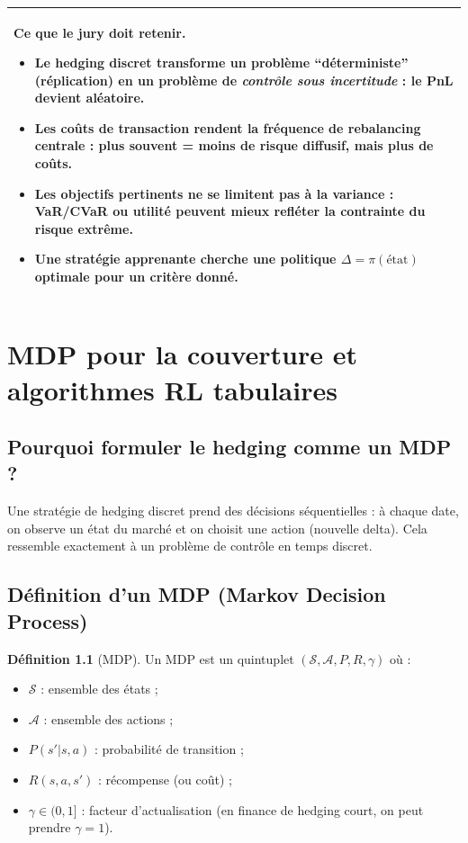 \documentclass[11pt,a4paper]{report}
\newcommand{\1}{\mathbbm{1}}
\theoremstyle{definition}
\newtheorem{definition}{Définition}[chapter]
\theoremstyle{plain}
\theoremstyle{remark}
\newenvironment{jurybox}{%
  \begin{center}
  \setlength{\tabcolsep}{6pt}%
  \renewcommand{\arraystretch}{1.1}%
  \begin{tabular}{|p{0.94\textwidth}|}
  \hline
  \small\textbf{Ce que le jury doit retenir.}\par\medskip
}{%
  \\ \hline
  \end{tabular}
  \end{center}
}
\begin{document}
\begin{jurybox}
\begin{itemize}
\item Le hedging discret transforme un problème ``déterministe'' (réplication) en un problème de \emph{contrôle sous incertitude} : le PnL devient aléatoire.
\item Les coûts de transaction rendent la fréquence de rebalancing centrale : plus souvent = moins de risque diffusif, mais plus de coûts.
\item Les objectifs pertinents ne se limitent pas à la variance : VaR/CVaR ou utilité peuvent mieux refléter la contrainte du risque extrême.
\item Une stratégie apprenante cherche une politique $\Delta=\pi(\text{état})$ optimale pour un critère donné.
\end{itemize}
\end{jurybox}

\chapter{MDP pour la couverture et algorithmes RL tabulaires}
\label{chap:mdp_rl}

\section{Pourquoi formuler le hedging comme un MDP ?}
Une stratégie de hedging discret prend des décisions séquentielles :
à chaque date, on observe un état du marché et on choisit une action (nouvelle delta).
Cela ressemble exactement à un problème de contrôle en temps discret.

\section{Définition d'un MDP (Markov Decision Process)}
\begin{definition}[MDP]
Un MDP est un quintuplet $(\mathcal{S},\mathcal{A},P,R,\gamma)$ où :
\begin{itemize}
  \item $\mathcal{S}$ : ensemble des états ;
  \item $\mathcal{A}$ : ensemble des actions ;
  \item $P(s'|s,a)$ : probabilité de transition ;
  \item $R(s,a,s')$ : récompense (ou coût) ;
  \item $\gamma\in(0,1]$ : facteur d'actualisation (en finance de hedging court, on peut prendre $\gamma=1$).
\end{itemize}
\end{definition}
\end{document}
